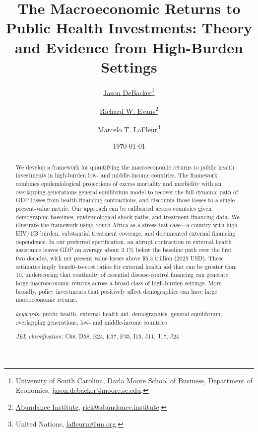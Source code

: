 \documentclass[letterpaper,12pt]{article}
\theoremstyle{definition}
\begin{document}
\hypersetup{pageanchor=false}
\begin{titlepage}
\title{The Macroeconomic Returns to Public Health Investments: Theory and Evidence from High-Burden Settings}
\date{\today}
\author{\href{http://jasondebacker.com/}{Jason DeBacker}\thanks{University of South Carolina, Darla Moore School of Business, Department of Economics, \href{mailto:jason.debacker@moore.sc.edu}{jason.debacker@moore.sc.edu}.}\and \href{https://sites.google.com/site/rickecon}{Richard W. Evans}\thanks{\href{https://abundance.institute/}{Abundance Institute}, \href{mailto:rick@abundance.institute}{rick@abundance.institute}.}\and Marcelo T. LaFleur\thanks{United Nations, \href{mailto:lafleurm@un.org}{lafleurm@un.org}.}}
\maketitle
\vspace{-2mm}
\begin{abstract}
\small{We develop a framework for quantifying the macroeconomic returns to public health investments in high-burden low- and middle-income countries. The framework combines epidemiological projections of excess mortality and morbidity with an overlapping generations general equilibrium model to recover the full dynamic path of GDP losses from health-financing contractions, and discounts those losses to a single present-value metric. Our approach can be calibrated across countries given demographic baselines, epidemiological shock paths, and treatment-financing data. We illustrate the framework using South Africa as a stress-test case---a country with high HIV/TB burden, substantial treatment coverage, and documented external financing dependence. In our preferred specification, an abrupt contraction in external health assistance leaves GDP on average about 2.1\% below the baseline path over the first two decades, with net present value losses above \$5.3 trillion (2025 USD). These estimates imply benefit-to-cost ratios for external health aid that can be greater than 10, underscoring that continuity of essential disease-control financing can generate large macroeconomic returns across a broad class of high-burden settings. More broadly, policy investments that positively affect demographics can have large macroeconomic returns.}

\vspace{10mm}

\noindent\textit{keywords:}\: public health, external health aid, demographics, general equilibrium, overlapping generations, low- and middle-income countries

\vspace{10mm}

\noindent\textit{JEL classification:} C68, D58, E24, E37, F35, I15, J11, J17, J24


\end{abstract}
\thispagestyle{empty}
\end{titlepage}
\hypersetup{pageanchor=true}
\end{document}
